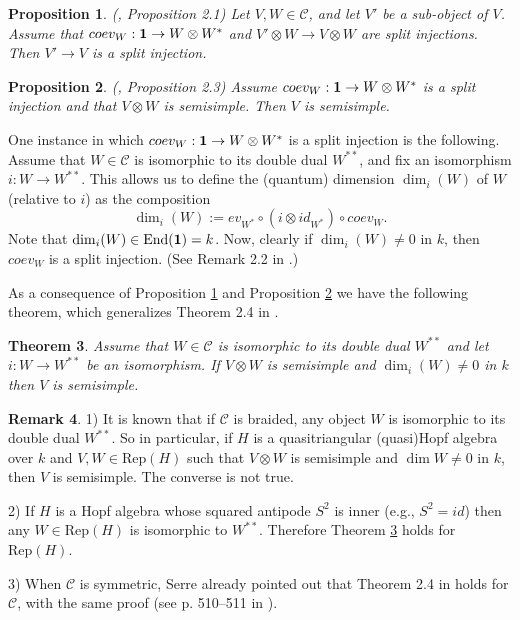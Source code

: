 \documentclass{amsart}
\newtheorem{theorem}{Theorem}[section]
\newtheorem{proposition}[theorem]{Proposition}
\theoremstyle{definition}
\newtheorem{remark}[theorem]{Remark}
\newcommand{\End}{\text{End}}
\newcommand{\Rep}{\text{Rep}}
\newcommand{\C}{{\mathcal C}}
\newcommand{\unit}{{\bf 1}}
\begin{document}
\begin{proposition}\label{s1} (\cite{s1}, Proposition 2.1)
Let $V,W\in \mathcal{C}$, and let $V'$ be a sub-object of $V$.
Assume that $coev_{W}: \unit \to W\otimes W^*$ and $V'\otimes W\to
V\otimes W$ are split injections. Then $V'\to V$ is a split
injection.
\end{proposition}

\begin{proposition}\label{s2} (\cite{s1}, Proposition 2.3)
Assume $coev_{W}: \unit \to W\otimes W^*$ is a split injection and
that $V\otimes W$ is semisimple. Then $V$ is semisimple.
\end{proposition}

One instance in which $coev_{W}: \unit \to W\otimes W^*$ is a split
injection is the following. Assume that $W\in \mathcal{C}$ is
isomorphic to its double dual $W^{**}$, and fix an isomorphism
$i:W\to W^{**}$. This allows us to define the (quantum) dimension
$\dim_i(W)$ of $W$ (relative to $i$) as the composition
$$\dim_i(W):= ev_{W^*}\circ (i\otimes id_{W^*})\circ coev_{W}.$$ Note that
$\dim_i(W)\in \End(\unit)=k$. Now, clearly if $\dim_i(W)\ne 0$ in
$k$, then $coev_{W}$ is a split injection. (See Remark 2.2 in
\cite{s1}.)

As a consequence of Proposition \ref{s1} and Proposition \ref{s2} we
have the following theorem, which generalizes Theorem 2.4 in
\cite{s1}.

\begin{theorem}\label{s3}
Assume that $W\in\C$ is isomorphic to its double dual $W^{**}$ and
let $i:W\to W^{**}$ be an isomorphism. If $V\otimes W$ is semisimple
and $\dim_i(W)\ne 0$ in $k$ then $V$ is semisimple.
\end{theorem}

\begin{remark}
1) It is known that if $\C$ is braided, any object $W$ is isomorphic
to its double dual $W^{**}$. So in particular, if $H$ is a
quasitriangular (quasi)Hopf algebra over $k$ and $V,W\in \Rep(H)$
such that $V\otimes W$ is semisimple and $\dim W\ne 0$ in $k$, then
$V$ is semisimple. The converse is not true.

2) If $H$ is a Hopf algebra whose squared antipode $S^2$ is inner
(e.g., $S^2=id$) then any $W\in \Rep(H)$ is isomorphic to $W^{**}$.
Therefore Theorem \ref{s3} holds for $\Rep(H)$.

3) When $\C$ is symmetric, Serre already pointed out that Theorem
2.4 in \cite{s1} holds for $\C$, with the same proof (see p.
510--511 in \cite{s1}).
\end{remark}
\end{document}
